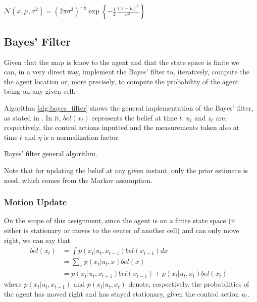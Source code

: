 \documentclass[runningheads]{llncs}
\begin{document}
\begin{definition}
    $\mathcal{N}(x, \mu, \sigma^2) = (2 \pi \sigma^2)^{-\frac{1}{2}} \exp \left\{ -\frac{1}{2} \frac{(x - \mu)^2}{\sigma^2} \right\}$
    \label{def:normal_distribution}
\end{definition}

\subsection{Bayes' Filter}
\label{subsec:bayes_filter}

Given that the map is know to the agent and that the state space is finite we can, in a very direct way, implement the Bayes' filter to, iteratively, compute the the agent location or, more precisely, to compute the probability of the agent being on any given cell.

Algorithm \ref{alg:bayes_filter} shows the general implementation of the Bayes' filter, as stated in \cite{thrun2005probabilistic}. In it, $bel(x_t)$ represents the belief at time $t$. $u_t$ and $z_t$ are, respectively, the control actions inputted and the measurements taken also at time $t$ and $\eta$ is a normalization factor.

\begin{algorithm}[!ht]
    \DontPrintSemicolon


\caption{Bayes' filter general algorithm.}
\label{alg:bayes_filter}
\end{algorithm}
\FloatBarrier

Note that for updating the belief at any given instant, only the prior estimate is need, which comes from the Markov assumption.

\subsubsection{Motion Update}

On the scope of this assignment, since the agent is on a finite state space (it either is stationary or moves to the center of another cell) and can only move right, we can say that
%
\begin{equation*} 
    \label{eq1}
    \begin{split}
        \overline{bel}(x_t) &= \int p(x_t \vert u_t, x_{t-1}) bel(x_{t-1}) dx \\
        & = \sum_{x} p(x_t \vert u_t, x) bel(x) \\
        & = p(x_t \vert u_t, x_{t-1}) bel(x_{t-1}) + p(x_t \vert u_t, x_t) bel(x_t)
    \end{split}
\end{equation*}
%
where $p(x_t \vert u_t, x_{t-1})$ and $p(x_t \vert u_t, x_t)$ denote, respectively, the probabilities of the agent has moved right and has stayed stationary, given the control action $u_t$.
\end{document}
